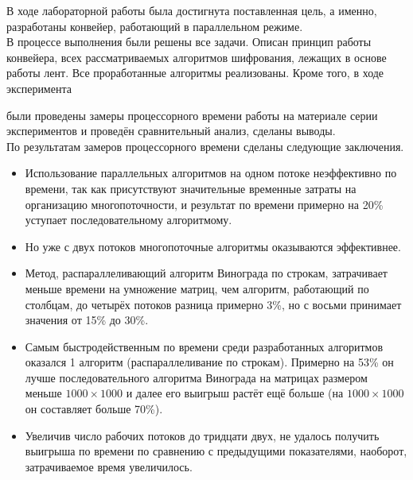 В ходе лабораторной работы была достигнута поставленная цель, а именно, разработаны конвейер, работающий в параллельном режиме.\\

В процессе выполнения были решены все задачи. Описан принцип работы конвейера, всех рассматриваемых алгоритмов шифрования, лежащих в основе работы лент. Все проработанные алгоритмы реализованы. Кроме того, в ходе эксперимента



были проведены замеры процессорного времени работы на материале серии экспериментов и проведён сравнительный анализ, сделаны выводы.\\

По результатам замеров процессорного времени сделаны следующие заключения.
\begin{itemize}
	\item Использование параллельных алгоритмов на одном потоке неэффективно по времени, так как присутствуют значительные временные затраты на организацию многопоточности, и результат по времени примерно на 20\% уступает последовательному алгоритмому. 
	\item Но уже с двух потоков многопоточные алгоритмы оказываются эффективнее.
	\item Метод, распараллеливающий алгоритм Винограда по строкам, затрачивает меньше времени на умножение матриц, чем алгоритм, работающий по столбцам, до четырёх потоков разница примерно 3\%, но с восьми принимает значения от 15\% до 30\%.
	\item Самым быстродейственным по времени среди разработанных алгоритмов оказался 1 алгоритм (распараллеливание по строкам). Примерно на 53\% он лучше последовательного алгоритма Винограда на матрицах размером меньше $1000 \times 1000$ и далее его выигрыш растёт ещё больше (на $1000 \times 1000$ он составляет больше 70\%).
	\item Увеличив число рабочих потоков до тридцати двух, не удалось получить выигрыша по времени по сравнению с предыдущими показателями, наоборот, затрачиваемое время увеличилось.
\end{itemize}